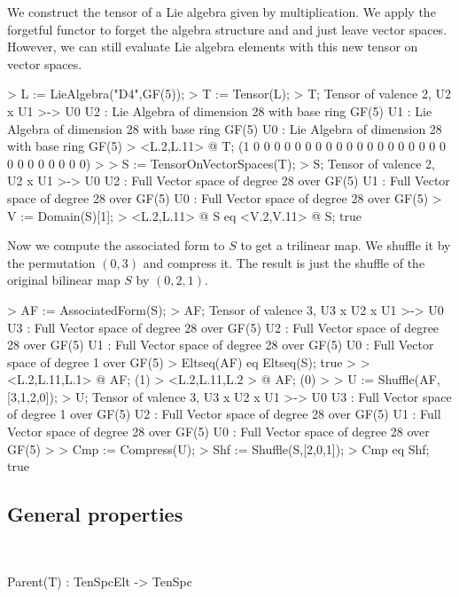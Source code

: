 \begin{example}
We construct the tensor of a Lie algebra given by multiplication. 
We apply the forgetful functor to forget the algebra structure and and just leave vector spaces.
However, we can still evaluate Lie algebra elements with this new tensor on vector spaces.

\begin{code}
> L := LieAlgebra("D4",GF(5));
> T := Tensor(L); 
> T;
Tensor of valence 2, U2 x U1 >-> U0
U2 : Lie Algebra of dimension 28 with base ring GF(5)
U1 : Lie Algebra of dimension 28 with base ring GF(5)
U0 : Lie Algebra of dimension 28 with base ring GF(5)
> <L.2,L.11> @ T;
(1 0 0 0 0 0 0 0 0 0 0 0 0 0 0 0 0 0 0 0 0 0 0 0 0 0 0 0)
> 
> S := TensorOnVectorSpaces(T);
> S;
Tensor of valence 2, U2 x U1 >-> U0
U2 : Full Vector space of degree 28 over GF(5)
U1 : Full Vector space of degree 28 over GF(5)
U0 : Full Vector space of degree 28 over GF(5)
> V := Domain(S)[1];
> <L.2,L.11> @ S eq <V.2,V.11> @ S;
true
\end{code}

Now we compute the associated form to $S$ to get a trilinear map. 
We shuffle it by the permutation $(0,3)$ and compress it.
The result is just the shuffle of the original bilinear map $S$ by $(0,2,1)$.

\begin{code}
> AF := AssociatedForm(S);
> AF;
Tensor of valence 3, U3 x U2 x U1 >-> U0
U3 : Full Vector space of degree 28 over GF(5)
U2 : Full Vector space of degree 28 over GF(5)
U1 : Full Vector space of degree 28 over GF(5)
U0 : Full Vector space of degree 1 over GF(5)
> Eltseq(AF) eq Eltseq(S);
true
> 
> <L.2,L.11,L.1> @ AF;
(1)
> <L.2,L.11,L.2 > @ AF;
(0)
> 
> U := Shuffle(AF,[3,1,2,0]);
> U;
Tensor of valence 3, U3 x U2 x U1 >-> U0
U3 : Full Vector space of degree 1 over GF(5)
U2 : Full Vector space of degree 28 over GF(5)
U1 : Full Vector space of degree 28 over GF(5)
U0 : Full Vector space of degree 28 over GF(5)
> 
> Cmp := Compress(U);
> Shf := Shuffle(S,[2,0,1]);
> Cmp eq Shf;
true
\end{code}
\end{example}

\subsection{General properties}~

\begin{intrinsics}
Parent(T) : TenSpcElt -> TenSpc
\end{intrinsics}

